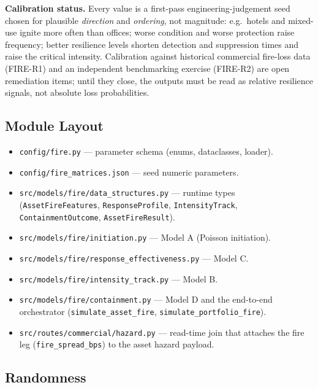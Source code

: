 \documentclass[11pt,a4paper]{article}
\begin{document}
\textbf{Calibration status.} Every value is a first-pass engineering-judgement
seed chosen for plausible \emph{direction} and \emph{ordering}, not magnitude:
e.g.\ hotels and mixed-use ignite more often than offices; worse condition and
worse protection raise frequency; better resilience levels shorten detection and
suppression times and raise the critical intensity. Calibration against
historical commercial fire-loss data (FIRE-R1) and an independent benchmarking
exercise (FIRE-R2) are open remediation items; until they close, the outputs
must be read as relative resilience signals, not absolute loss probabilities.

\mkmimplementation

\subsection{Module Layout}

\begin{itemize}
  \item \texttt{config/fire.py} --- parameter schema (enums, dataclasses, loader).
  \item \texttt{config/fire\_matrices.json} --- seed numeric parameters.
  \item \texttt{src/models/fire/data\_structures.py} --- runtime types
        (\texttt{AssetFireFeatures}, \texttt{ResponseProfile},
        \texttt{IntensityTrack}, \texttt{ContainmentOutcome},
        \texttt{AssetFireResult}).
  \item \texttt{src/models/fire/initiation.py} --- Model A (Poisson initiation).
  \item \texttt{src/models/fire/response\_effectiveness.py} --- Model C.
  \item \texttt{src/models/fire/intensity\_track.py} --- Model B.
  \item \texttt{src/models/fire/containment.py} --- Model D and the end-to-end
        orchestrator (\texttt{simulate\_asset\_fire},
        \texttt{simulate\_portfolio\_fire}).
  \item \texttt{src/routes/commercial/hazard.py} --- read-time join that attaches
        the fire leg (\texttt{fire\_spread\_bps}) to the asset hazard payload.
\end{itemize}

\subsection{Randomness}
\end{document}
